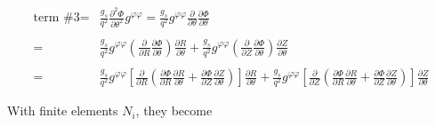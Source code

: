 \documentclass{report}
\newcommand{\ff}[2]{\frac{#1}{#2}}
\newcommand{\pp}[2]{\frac{\partial{#1}}{\partial{#2}}}
\newcommand{\psp}[2]{\frac{\partial^2{#1}}{\partial{#2}^2}}
\begin{document}
\begin{equation}
\label{eq:poisson7-term3}
   \begin{array}{rl}
\mbox{term \#3}= 
&           \ff{g_s}{q^2} \psp{\Phi}{\theta} g^{\varphi \varphi} =
            \ff{g_s}{q^2} g^{\varphi \varphi} \pp{}{\theta} \pp{\Phi}{\theta} \\
 & \\
=&
            \ff{g_s}{q^2} g^{\varphi \varphi} (\pp{}{R} \pp{\Phi}{\theta}) \pp{R}{\theta} +
            \ff{g_s}{q^2} g^{\varphi \varphi} (\pp{}{Z} \pp{\Phi}{\theta}) \pp{Z}{\theta}
\\
 & \\
=&
 \ff{g_s}{q^2} g^{\varphi \varphi} [\pp{}{R} (\pp{\Phi}{R} \pp{R}{\theta} + \pp{\Phi}{Z} \pp{Z}{\theta})] \pp{R}{\theta} +
 \ff{g_s}{q^2} g^{\varphi \varphi} [\pp{}{Z} (\pp{\Phi}{R} \pp{R}{\theta} + \pp{\Phi}{Z} \pp{Z}{\theta})] \pp{Z}{\theta}
   \end{array}
\end{equation}

\noindent
With finite elements $N_i$, they become
\end{document}
